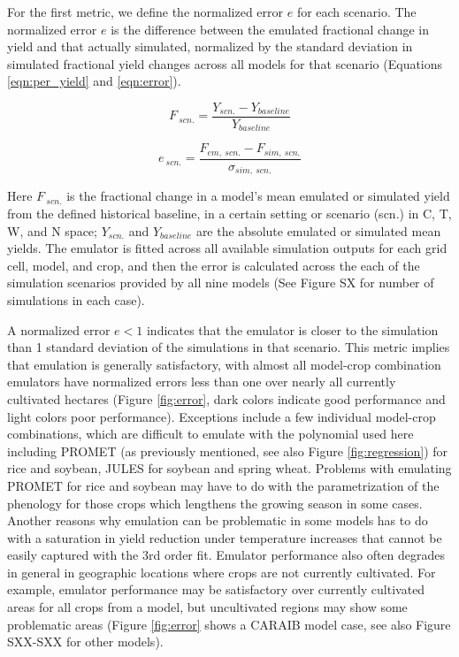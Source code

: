 \documentclass[gmd, manuscript]{copernicus} %
\begin{document}
For the first metric, we define the normalized error $e$ for each scenario. The normalized error $e$ is the difference between the emulated fractional change in yield and that actually simulated, normalized by the standard deviation in simulated fractional yield changes across all models for that scenario (Equations \ref{eqn:per_yield} and  \ref{eqn:error}). 

\begin{equation}
    \label{eqn:per_yield}
    F_{\: scn.}= \frac{Y_{scn.}-Y_{baseline}}{Y_{baseline}}
\end{equation}

\begin{equation}
    \label{eqn:error}
    e_{\: scn.} = \frac{F_{em, \: scn.}-F_{sim, \: scn.}}{\sigma_{sim, \: scn.}}
\end{equation}

Here $F_{\: scn.}$ is the fractional change in a model's mean emulated or simulated yield from the defined historical baseline, in a certain setting or scenario (scn.) in C, T, W, and N space; $Y_{scn.}$ and $Y_{baseline}$ are the absolute emulated or simulated mean yields. 
The emulator is fitted across all available simulation outputs for each grid cell, model, and crop, and then the error is calculated across the each of the simulation scenarios provided by all nine models (See Figure SX for number of simulations in each case). 

A normalized error $e<1$ indicates that the emulator is closer to the simulation than 1 standard deviation of the simulations in that scenario.
This metric implies that emulation is generally satisfactory, with almost all model-crop combination emulators have normalized errors less than one over nearly all currently cultivated hectares (Figure \ref{fig:error}, dark colors indicate good performance and light colors poor performance). 
Exceptions include a few individual model-crop combinations, which are difficult to emulate with the polynomial used here including PROMET (as previously mentioned, see also Figure \ref{fig:regression}) for rice and soybean, JULES for soybean and spring wheat. 
Problems with emulating PROMET for rice and soybean may have to do with the parametrization of the phenology for those crops which lengthens the growing season in some cases. 
Another reasons why emulation can be problematic in some models has to do with a saturation in yield reduction under temperature increases that cannot be easily captured with the 3rd order fit.
Emulator performance also often degrades in general in geographic locations where crops are not currently cultivated. 
For example, emulator performance may be satisfactory over currently cultivated areas for all crops from a model, but uncultivated regions may show some problematic areas (Figure \ref{fig:error} shows a CARAIB model case, see also Figure SXX-SXX for other models).
\end{document}
